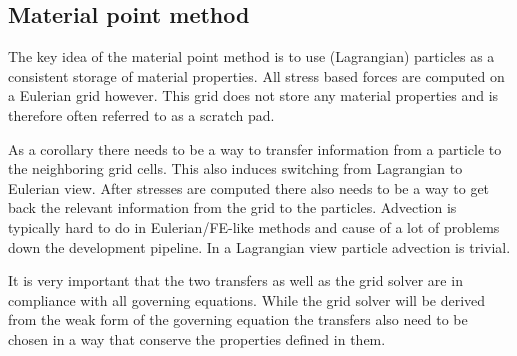 \documentclass[m,times]{cgMA}
\begin{document}
\subsection{Material point method}\label{sec:mat_point}
The key idea of the material point method is to use (Lagrangian) particles as a consistent storage of material properties. All stress based forces are computed on a Eulerian grid however. This grid does not store any material properties and is therefore often referred to as a scratch pad.

As a corollary there needs to be a way to transfer information from a particle to the neighboring grid cells. This also induces switching from Lagrangian to Eulerian view. After stresses are computed there also needs to be a way to get back the relevant information from the grid to the particles. Advection is typically hard to do in Eulerian/FE-like methods and cause of a lot of problems down the development pipeline. In a Lagrangian view particle advection is trivial.

It is very important that the two transfers as well as the grid solver are in compliance with all governing equations. While the grid solver will be derived from the weak form of the governing equation the transfers also need to be chosen in a way that conserve the properties defined in them.
\cite{MPM:COURSE}
\end{document}
